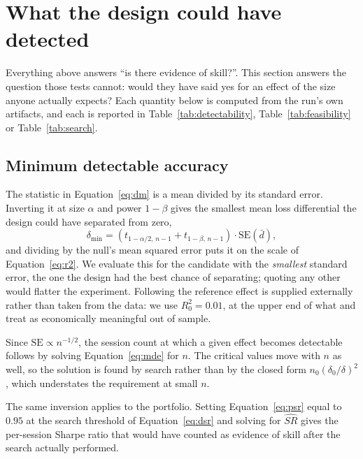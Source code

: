 \documentclass{article}
\theoremstyle{plain}
\theoremstyle{remark}
\begin{document}
\section{What the design could have detected}
\label{sec:power}

Everything above answers ``is there evidence of skill?''. This section answers
the question those tests cannot: would they have said yes for an effect of the
size anyone actually expects? Each quantity below is computed from the run's own
artifacts, and each is reported in Table~\ref{tab:detectability},
Table~\ref{tab:feasibility} or Table~\ref{tab:search}.

\subsection{Minimum detectable accuracy}

The statistic in Equation~\ref{eq:dm} is a mean divided by its standard error.
Inverting it at size $\alpha$ and power $1-\beta$ gives the smallest mean loss
differential the design could have separated from zero,
\begin{equation}
\label{eq:mde}
\delta_{\min} = \left(t_{1-\alpha/2,\,n-1} + t_{1-\beta,\,n-1}\right)
\cdot \mathrm{SE}(\bar d),
\end{equation}
and dividing by the null's mean squared error puts it on the scale of
Equation~\ref{eq:r2}. We evaluate this for the candidate with the \emph{smallest}
standard error, the one the design had the best chance of separating; quoting any
other would flatter the experiment. Following \citet{gelman2014} the reference
effect is supplied externally rather than taken from the data: we use
$R^2_0 = 0.01$, at the upper end of what \citet{campbell2008} and
\citet{gu2020} treat as economically meaningful out of sample.

Since $\mathrm{SE} \propto n^{-1/2}$, the session count at which a given effect
becomes detectable follows by solving Equation~\ref{eq:mde} for $n$. The
critical values move with $n$ as well, so the solution is found by search rather
than by the closed form $n_0(\delta_0/\delta)^2$, which understates the
requirement at small $n$.

The same inversion applies to the portfolio. Setting Equation~\ref{eq:psr} equal
to $0.95$ at the search threshold of Equation~\ref{eq:dsr} and solving for
$\hat{SR}$ gives the per-session Sharpe ratio that would have counted as
evidence of skill after the search actually performed.
\end{document}
